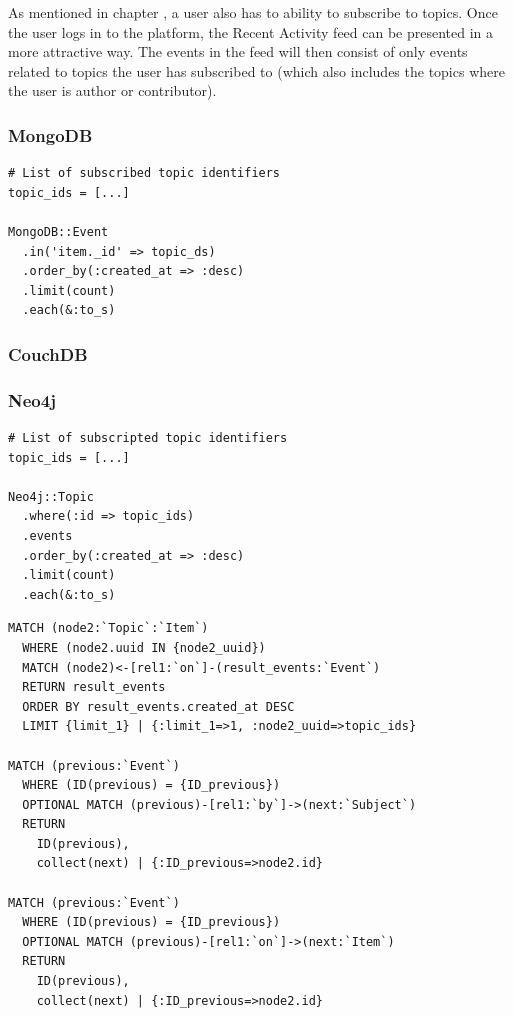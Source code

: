 As mentioned in chapter , a user also has to ability to subscribe to topics.
Once the user logs in to the platform, the Recent Activity feed can be presented in a more attractive way.
The events in the feed will then consist of only events related to topics the user has subscribed to (which also includes the topics where the user is author or contributor).

\subsubsection*{MongoDB}

\begin{verbatim}
# List of subscribed topic identifiers
topic_ids = [...]

MongoDB::Event
  .in('item._id' => topic_ds)
  .order_by(:created_at => :desc)
  .limit(count)
  .each(&:to_s)
\end{verbatim}

\subsubsection*{CouchDB}


\subsubsection*{Neo4j}

\begin{verbatim}
# List of subscripted topic identifiers
topic_ids = [...]

Neo4j::Topic
  .where(:id => topic_ids)
  .events
  .order_by(:created_at => :desc)
  .limit(count)
  .each(&:to_s)
\end{verbatim}

\begin{verbatim}
MATCH (node2:`Topic`:`Item`)
  WHERE (node2.uuid IN {node2_uuid})
  MATCH (node2)<-[rel1:`on`]-(result_events:`Event`)
  RETURN result_events
  ORDER BY result_events.created_at DESC
  LIMIT {limit_1} | {:limit_1=>1, :node2_uuid=>topic_ids}

MATCH (previous:`Event`)
  WHERE (ID(previous) = {ID_previous})
  OPTIONAL MATCH (previous)-[rel1:`by`]->(next:`Subject`)
  RETURN
    ID(previous),
    collect(next) | {:ID_previous=>node2.id}

MATCH (previous:`Event`)
  WHERE (ID(previous) = {ID_previous})
  OPTIONAL MATCH (previous)-[rel1:`on`]->(next:`Item`)
  RETURN
    ID(previous),
    collect(next) | {:ID_previous=>node2.id}
\end{verbatim}

